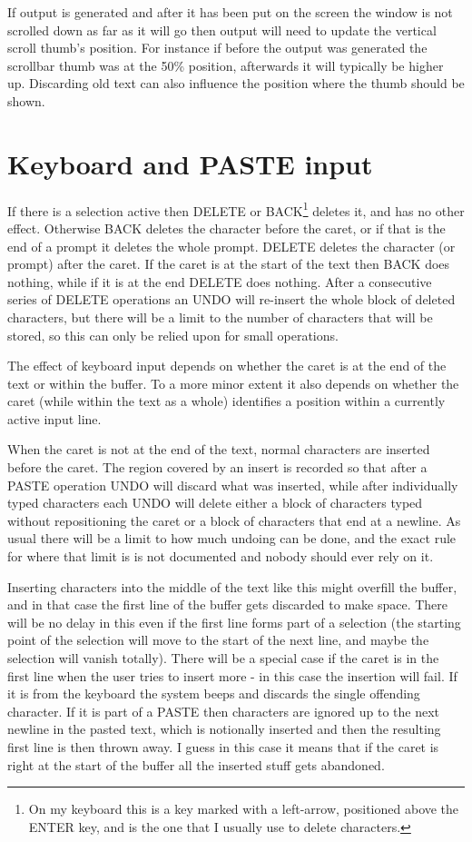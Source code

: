 \documentclass[a4paper,11pt]{article}
\begin{document}
If output is generated and after it has been put on the screen the window
is not scrolled down as far as it will go then output will need to update the
vertical scroll thumb's position. For instance if before the output was
generated the scrollbar thumb was at the 50\% position, afterwards it will
typically be higher up. Discarding old text can also influence the
position where the thumb should be shown.

\section{Keyboard and PASTE input}
If there is a selection active then DELETE or BACK\footnote{On my keyboard
this is a key marked with a left-arrow, positioned above the ENTER key, and
is the one that I usually use to delete characters.} deletes it, and has no
other effect. Otherwise BACK deletes the character before the caret, or if that is the end of a
prompt it deletes the whole prompt. DELETE deletes the character (or prompt)
after the caret. If the caret is at the start of the text then BACK does
nothing, while if it is at the end DELETE does nothing.
After a consecutive series of DELETE operations an UNDO will re-insert the
whole block of deleted characters, but there will be
a limit to the number of characters that will be stored, so this can only
be relied upon for small operations.

The effect of keyboard input depends on whether the caret is at the
end of the text or within the buffer. To a more minor extent it also
depends on whether the caret (while within the text as a whole) identifies
a position within a currently active input line.

When the caret is not at the end of the text, normal characters are inserted
before the caret. The region covered by an insert is recorded so that after
a PASTE operation UNDO will discard what was inserted, while after
individually typed characters each UNDO will delete either a block of
characters typed without repositioning the caret or a block of characters
that end at a newline. As usual there will be a limit to how much undoing can
be done, and the exact rule for where that limit is is not documented and
nobody should ever rely on it.

Inserting characters into the middle of the text like this might overfill the
buffer, and in that case the first line of the buffer gets discarded to make
space. There will be no delay in this even if the first line forms part of
a selection (the starting point of the selection will move to the start of the
next line, and maybe the selection will vanish totally). There will be a
special case if the caret is in the first line when the user tries to insert
more - in this case the insertion will fail. If it is from the keyboard
the system beeps and discards the single offending character. If it is
part of a PASTE then characters are ignored up to the next newline in the
pasted text, which is notionally inserted and then the resulting first line
is then thrown away. I guess in this case it means that if the caret is right
at the start of the buffer all the inserted stuff gets abandoned.
\end{document}
